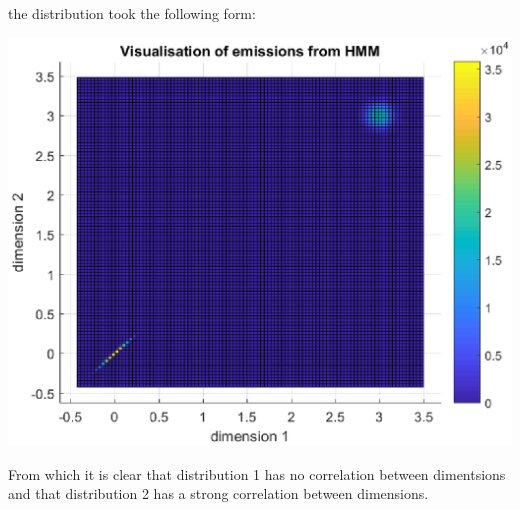 \documentclass[]{article}
\let\origfigure\figure
\let\endorigfigure\endfigure
\renewenvironment{figure}[1][2] {
    \expandafter\origfigure\expandafter[H]
} {
    \endorigfigure
}
\begin{document}
the distribution took the following form:

\begin{figure}
\centering
\includegraphics{Result_Pics/emissionMultVar.eps}
\caption{100 samples from HMM with multivariate gaussian distributions}
\end{figure}

From which it is clear that distribution 1 has no correlation between
dimentsions and that distribution 2 has a strong correlation between
dimensions.
\end{document}
